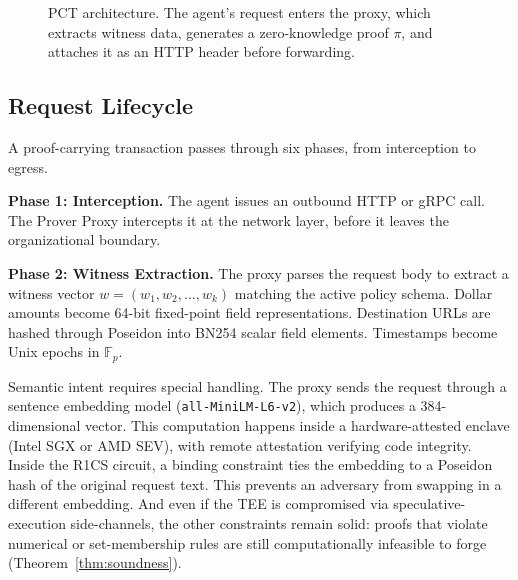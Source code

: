 \documentclass[10pt,conference]{IEEEtran}
\begin{document}
\begin{figure}[t]
\centering
{}
\caption{PCT architecture. The agent's request enters the proxy, which extracts witness data, generates a zero-knowledge proof $\pi$, and attaches it as an HTTP header before forwarding.}
\label{fig:architecture}
\end{figure}

\subsection{Request Lifecycle}

A proof-carrying transaction passes through six phases, from interception to egress.

\textbf{Phase 1: Interception.} The agent issues an outbound HTTP or gRPC call. The Prover Proxy intercepts it at the network layer, before it leaves the organizational boundary.

\textbf{Phase 2: Witness Extraction.} The proxy parses the request body to extract a witness vector $w = (w_1, w_2, \ldots, w_k)$ matching the active policy schema. Dollar amounts become 64-bit fixed-point field representations. Destination URLs are hashed through Poseidon into BN254 scalar field elements. Timestamps become Unix epochs in $\mathbb{F}_p$.

Semantic intent requires special handling. The proxy sends the request through a sentence embedding model (\texttt{all-MiniLM-L6-v2}), which produces a 384-dimensional vector. This computation happens inside a hardware-attested enclave (Intel SGX or AMD SEV), with remote attestation verifying code integrity. Inside the R1CS circuit, a binding constraint ties the embedding to a Poseidon hash of the original request text. This prevents an adversary from swapping in a different embedding. And even if the TEE is compromised via speculative-execution side-channels, the other constraints remain solid: proofs that violate numerical or set-membership rules are still computationally infeasible to forge (Theorem~\ref{thm:soundness}).
\end{document}
